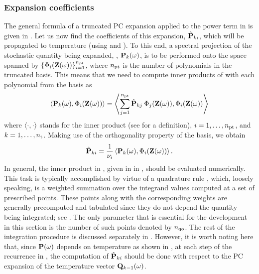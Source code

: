 \subsubsection{Expansion coefficients} 
The general formula of a truncated PC expansion applied to the power term in  is given in .
Let us now find the coefficients of this expansion, $\hat{\mathbf{P}}_{ki}$, which will be propagated to temperature (using  and ).
To this end, a spectral projection of the stochastic quantity being expanded, \ie, $\mathbf{P}_k(\omega)$, is to be performed onto the space spanned by $\{ \Phi_i(\mathbf{Z}(\omega)) \}_{i = 1}^{{n_\text{pt}}}$, where ${n_\text{pt}}$ is the number of polynomials in the truncated basis.
This means that we need to compute inner products of  with each polynomial from the basis as
\[
  \oInner{\vP_k(\o)}{\pcb_i(\vZ(\o))} = \oInner{\sum_{j=1}^{\pcterms} \pcc{\vP}_{kj} \: \pcb_j(\vZ(\o))}{\pcb_i(\vZ(\o))}
\]
where $\oInner{\cdot}{\cdot}$ stands for the inner product (see  for a definition), $i = 1, \dotsc, {n_\text{pt}}$, and $k = 1, \dotsc, {n_\text{t}}$. Making use of the orthogonality property of the basis, we obtain
\begin{equation} \elabel{pc-coefficients}
  \pcc{\vP}_{ki} = \frac{1}{\pcn_i} \oInner{\vP_k(\o)}{\pcb_i(\vZ(\o))}.
\end{equation}
In general, the inner product in , given in  in , should be evaluated numerically.
This task is typically accomplished by virtue of a quadrature rule \cite{press2007}, which, loosely speaking, is a weighted summation over the integrand values computed at a set of prescribed points.
These points along with the corresponding weights are generally precomputed and tabulated since they do not depend the quantity being integrated; see .
The only parameter that is essential for the development in this section is the number of such points denoted by ${n_\text{qo}}$.
The rest of the integration procedure is discussed separately in .
However, it is worth noting here that, since $\mathbf{P}(\omega)$ depends on temperature as shown in , at each step of the recurrence in , the computation of $\hat{\mathbf{P}}_{ki}$ should be done with respect to the PC expansion of the temperature vector $\mathbf{Q}_{k - 1}(\omega)$.

